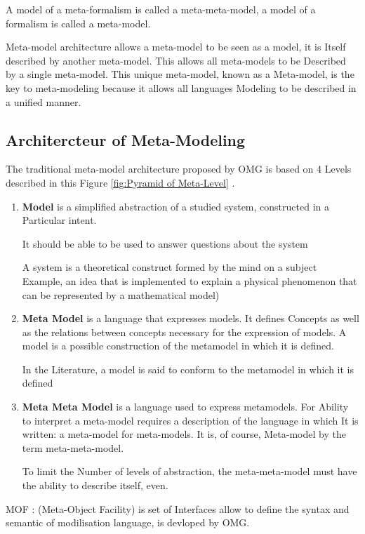 A model of a meta-formalism is called a meta-meta-model, a model of a formalism is called a meta-model\cite{ch3-meta2}.

Meta-model architecture allows a meta-model to be seen as a model, it is
Itself described by another meta-model. This allows all meta-models to be
Described by a single meta-model. This unique meta-model, known as a
Meta-model, is the key to meta-modeling because it allows all languages
Modeling to be described in a unified manner.


\subsection{Architercteur of Meta-Modeling}
The traditional meta-model architecture proposed by OMG is based on 4 Levels
described in this Figure \ref{fig:Pyramid of Meta-Level} \cite{ch3-doc, ch3-mml} .

\begin{enumerate}
\item \textbf{Model} is a simplified abstraction of a studied system, constructed in a
Particular intent. 

It should be able to be used to answer questions about the system

A system is a theoretical construct formed by the mind on a subject
Example, an idea that is implemented to explain a physical phenomenon that can
be represented by a mathematical model) 

\item \textbf{Meta Model} is a language that expresses models. It defines
Concepts as well as the relations between concepts necessary for the expression of models. 
A model is a possible construction of the metamodel in which it is defined.

In the Literature, a model is said to conform to the metamodel in which it is defined

\item \textbf{Meta Meta Model} is a language used to express metamodels. 
For Ability to interpret a meta-model requires a description of the language in which
It is written: a meta-model for meta-models. 
It is, of course, Meta-model by the term meta-meta-model. 

To limit the  Number of levels of abstraction, the meta-meta-model 
must have the ability to describe itself, even. 
 

\end{enumerate}

MOF : (Meta-Object Facility) is set of Interfaces allow to define 
the syntax and semantic of modilisation language, is devloped by OMG\cite{ch3-doc, ch3-doc}.

